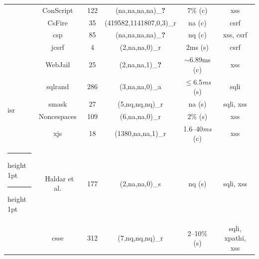 \documentclass[10pt,journal,compsoc]{IEEEtran}
\makeatletter
\newcommand{\tick}{\ding{52}}
\newcommand{\xmark}{\ding{56}}
\newcommand{\thickhline}{%
    \noalign {\ifnum 0=`}\fi \hrule height 1pt
    \futurelet \reserved@a \@xhline
}
\makeatother
\begin{document}
\begin{table}[t]
\begin{threeparttable}
\begin{small}
{\begin{tabular}{l|c|c|cc|c}
  &   ConScript~\cite{ML10} & 122 & ({\sc na},{\sc na},{\sc na},{\sc na})\_{\bf ?} & 7\% ({\sc c}) & {\sc xss} \\
  &   CsFire~\cite{DDHPJ10} & 35 & (419582,1141807,0,3)\_r\tnote{5} & {\sc na} ({\sc c}) & {\sc csrf} \\
  &   {\sc csp}~\cite{SSM10} & 85 & ({\sc na},{\sc na},{\sc na},{\sc na})\_{\bf ?} & {\sc nq} ({\sc c}) & {\sc xss}, {\sc csrf} \\
  &   j{\sc csrf}~\cite{PS11} & 4 & (2,{\sc na},{\sc na},0)\_r & 2ms ({\sc s}) & {\sc csrf} \\
  &   WebJail~\cite{VDDPJ11} & 25 & (2,{\sc na},{\sc na},1)\_{\bf ?} & $\sim$6.89ms ({\sc c}) & {\sc xss} \\
  \hline
  \multirow{4}{*}{{\sc isr}}
  &   {\sc sql}rand~\cite{BK04} & 286 & (3,{\sc na},{\sc na},0)\_a & $\le$6.5{\it ms} ({\sc s}) & {\sc sql}i \\
  &   {\sc sm}ask~\cite{JB07} & 27 & (5,{\sc nq},{\sc nq},{\sc nq})\_r  & {\sc na} ({\sc s}) & {\sc sql}i, {\sc xss} \\
  &   Noncespaces~\cite{GC09} & 109 & (6,{\sc na},{\sc na},0)\_r &  2\% ({\sc s}) & {\sc xss} \\ 
  &   x{\sc js}~\cite{APKLM10} & 18 & (1380,{\sc na},{\sc na},1)\_r & 1.6--40{\it ms} ({\sc c}) & {\sc xss} \\
  \thickhline
  \thickhline
  \multirow{7}{*}{Taint Tracking}
  &   Haldar et al.~\cite{HCF05} & 177 & (2,{\sc na},{\sc na},0)\_s & {\sc nq} ({\sc s}) & {\sc sql}i, {\sc xss} \\ 
  &   {\sc csse}~\cite{PB05} & 312 & (7,{\sc nq},{\sc nq},{\sc nq})\_r & 2--10\% ({\sc s}) & {\sc sql}i, {\sc xp}athi, {\sc xss} \\

\end{tabular}}
\end{small}
\end{threeparttable}
\end{table}
\end{document}
